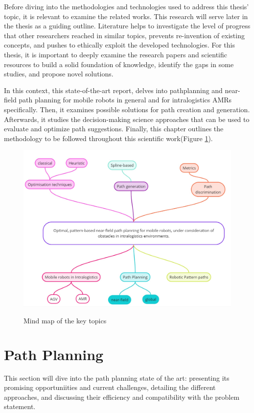 Before diving into the methodologies and technologies used to address this thesis’ 
topic, it is relevant to examine the related works. This research will serve later in 
the thesis as a guiding outline. Literature helps to investigate the level of progress that 
other researchers reached in similar topics, prevents re-invention of existing concepts, 
and pushes to ethically exploit the developed technologies. For this thesis, it is 
important to deeply examine the research papers and scientific resources to build a 
solid foundation of knowledge, identify the gaps in some studies, and propose novel 
solutions.  

In this context, this state-of-the-art report, delves 
into pathplanning and near-field path planning for mobile robots 
in general and for intralogistics AMRs specifically. Then, it examines possible 
solutions for path creation and generation. Afterwards, 
it studies the decision-making science approaches that can be used to evaluate and 
optimize path suggestions. Finally, this chapter 
outlines the methodology to be followed throughout this scientific work(Figure \ref{mindmap}).

\begin{figure}[H]
    \begin{center}
       \includegraphics[width=5in]{images/Chap1/Fig1.jpg}\\
       \caption{Mind map of the key topics}
       \label{mindmap}
       \end{center}
\end{figure}

\newpage
\section{Path Planning}
This section will dive into the path planning state of the art: presenting its promising 
opportuniities and current challenges, detailing the different approaches, and discussing
their efficiency and compatibility with the problem statement.

